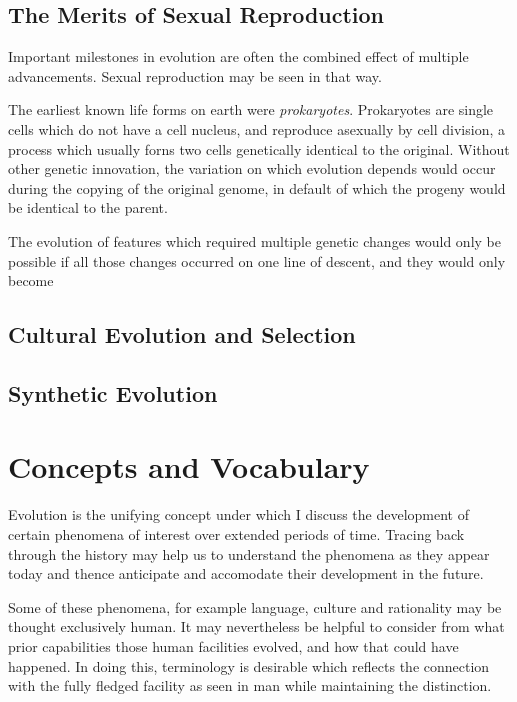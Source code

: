 \documentclass[10pt,titlepage]{book}
\begin{document}
\subsection{The Merits of Sexual Reproduction}

Important milestones in evolution are often the combined effect of multiple advancements.
Sexual reproduction may be seen in that way.

The earliest known life forms on earth were \emph{prokaryotes}.
Prokaryotes are single cells which do not have a cell nucleus, and reproduce asexually by cell division, a process which usually forns two cells genetically identical to the original.
Without other genetic innovation, the variation on which evolution depends would occur during the copying of the original genome, in default of which the progeny would be identical to the parent.

The evolution of features which required multiple genetic changes would only be possible if all those changes occurred on one line of descent, and they would only become

\subsection{Cultural Evolution and Selection}

\subsection{Synthetic Evolution}
  
\section{Concepts and Vocabulary}

Evolution is the unifying concept under which I discuss the development of certain phenomena of interest over extended periods of time.
Tracing back through the history may help us to understand the phenomena as they appear today and thence anticipate and accomodate their development in the future.

Some of these phenomena, for example language, culture and rationality may be thought exclusively human.
It may nevertheless be helpful to consider from what prior capabilities those human facilities evolved, and how that could have happened.
In doing this, terminology is desirable which reflects the connection with the fully fledged facility as seen in man while maintaining the distinction.
\end{document}
